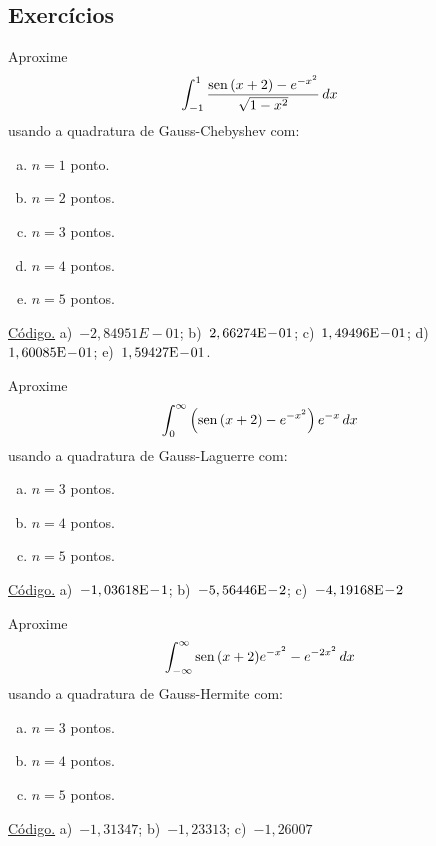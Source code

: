 \subsection*{Exercícios}

\begin{exer}\label{exer:GL_fun}
  Aproxime
  \begin{equation}
    \int_{-1}^1 \frac{\operatorname{sen}\,(x+2)-e^{-x^2}}{\sqrt{1-x^2}}\,dx
  \end{equation}
usando a quadratura de Gauss-Chebyshev com:
\begin{enumerate}[a)]
\item $n=1$ ponto.
\item $n=2$ pontos.
\item $n=3$ pontos.
\item $n=4$ pontos.
\item $n=5$ pontos.
\end{enumerate}
\end{exer}
\begin{resp}
  \ifisoctave 
  \href{https://github.com/phkonzen/notas/blob/master/src/MatematicaNumerica/cap_integr/dados/exer_GC_fun/exer_GC_fun.m}{Código.} 
  \fi
  a)~$-2,84951E-01$; b)~$2,66274\mathrm{E}\!-\!01$; c)~$1,49496\mathrm{E}\!-\!01$; d)~$1,60085\mathrm{E}\!-\!01$; e)~$1,59427\mathrm{E}\!-\!01$.
\end{resp}

\begin{exer}\label{exer:GLa_fun}
  Aproxime
  \begin{equation}
    \int_{0}^\infty \left(\operatorname{sen}\,(x+2)-e^{-x^2}\right)e^{-x}\,dx
  \end{equation}
usando a quadratura de Gauss-Laguerre com:
\begin{enumerate}[a)]
\item $n=3$ pontos.
\item $n=4$ pontos.
\item $n=5$ pontos.
\end{enumerate}
\end{exer}
\begin{resp}
  \ifisoctave 
  \href{https://github.com/phkonzen/notas/blob/master/src/MatematicaNumerica/cap_integr/dados/exer_GLa_fun/exer_GLa_fun.m}{Código.} 
  \fi
  a)~$-1,03618\mathrm{E}\!-\!1$; b)~$-5,56446\mathrm{E}\!-\!2$; c)~$-4,19168\mathrm{E}\!-\!2$
\end{resp}

\begin{exer}\label{exer:GH_fun}
  Aproxime
  \begin{equation}
    \int_{-\infty}^\infty \operatorname{sen}\,(x+2)e^{-x^2}-e^{-2x^2}\,dx
  \end{equation}
usando a quadratura de Gauss-Hermite com:
\begin{enumerate}[a)]
\item $n=3$ pontos.
\item $n=4$ pontos.
\item $n=5$ pontos.
\end{enumerate}
\end{exer}
\begin{resp}
  \ifisoctave 
  \href{https://github.com/phkonzen/notas/blob/master/src/MatematicaNumerica/cap_integr/dados/exer_GH_fun/exer_GH_fun.m}{Código.} 
  \fi
  a)~$-1,31347$; b)~$-1,23313$; c)~$-1,26007$
\end{resp}

